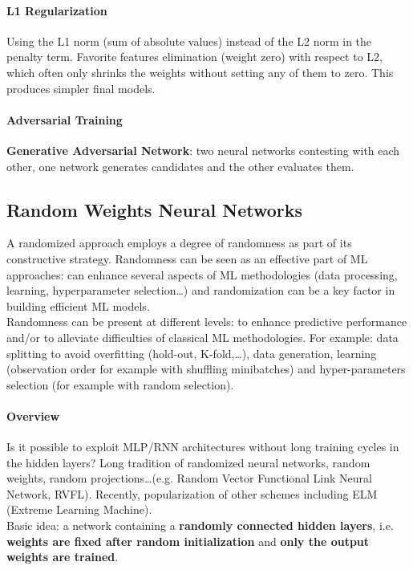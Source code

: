 \documentclass[10pt]{report}
\begin{document}
\paragraph{L1 Regularization}
Using the L1 norm (sum of absolute values) instead of the L2 norm in the penalty term. Favorite features elimination (weight zero) with respect to L2, which often only shrinks the weights without setting any of them to zero. This produces simpler final models.
\paragraph{Adversarial Training} \textbf{Generative Adversarial Network}: two neural networks contesting with each other, one network generates candidates and the other evaluates them.
\subsection{Random Weights Neural Networks} A randomized approach employs a degree of randomness as part of its constructive strategy. Randomness can be seen as an effective part of ML approaches: can enhance several aspects of ML methodologies (data processing, learning, hyperparameter selection\ldots) and randomization can be a key factor in building efficient ML models.\\
Randomness can be present at different levels: to enhance predictive performance and/or to alleviate difficulties of classical ML methodologies. For example: data splitting to avoid overfitting (hold-out, K-fold,\ldots), data generation, learning (observation order for example with shuffling minibatches) and hyper-parameters selection (for example with random selection).
\paragraph{Overview} Is it possible to exploit MLP/RNN architectures without long training cycles in the hidden layers? Long tradition of randomized neural networks, random weights, random projections\ldots (e.g. Random Vector Functional Link Neural Network, RVFL). Recently, popularization of other schemes including ELM (Extreme Learning Machine).\\
Basic idea: a network containing a \textbf{randomly connected hidden layers}, i.e. \textbf{weights are fixed after random initialization} and \textbf{only the output weights are trained}.
\end{document}
